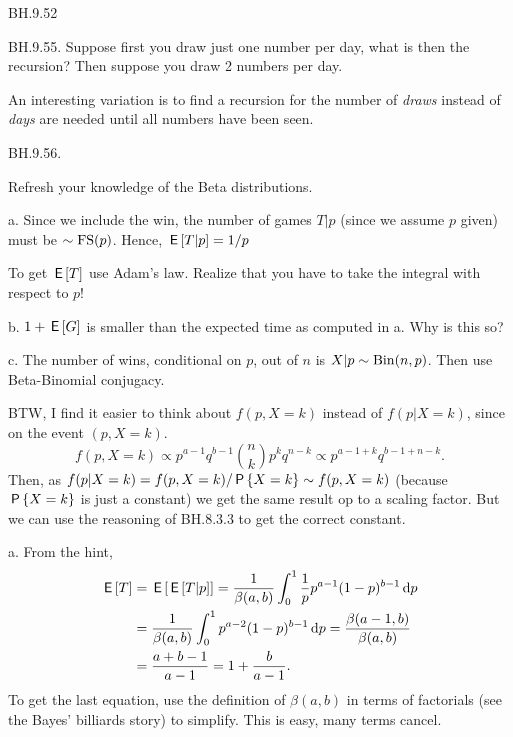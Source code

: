 \begin{exercise}
BH.9.52
\end{exercise}

\begin{exercise}
BH.9.55.  Suppose first you draw just one number per day, what is then the recursion? Then suppose you draw 2 numbers per day.

An interesting variation is to find a recursion for the number of \emph{draws} instead of \emph{days} are needed until all  numbers have been seen.
\end{exercise}

\begin{exercise}
BH.9.56.
\begin{hint}
Refresh your  knowledge of the Beta distributions.

a. Since we include the win, the number of games $T|p$ (since we assume $p$ given) must be $\sim\FS{p}$. Hence, $\E{T|p} = 1/p$

To get $\E T$ use Adam's law. Realize that you have to take the integral with respect to $p$!

b. $1+\E G$ is smaller than the expected time as computed in a. Why is this so?

c. The number of wins, conditional on $p$, out of $n$ is $X|p\sim\Bin{n,p}$. Then use Beta-Binomial conjugacy.

BTW, I find it easier to think about $f(p, X=k)$ instead of $f(p|X=k)$, since on the event $(p, X=k)$.
\begin{equation*}
f(p, X=k) \propto p^{a-1} q^{b-1} {n \choose k} p^k q^{n-k} \propto p^{a-1+k}q^{b-1+n-k}.
\end{equation*}
Then, as  $f(p|X=k) = f(p, X=k)/\P{X=k} \sim f(p, X=k)$ (because $\P{X=k}$ is just a constant) we get the same result op to a scaling factor. But we can use the reasoning of BH.8.3.3 to get the correct constant.
\end{hint}
\begin{solution}
a. From the hint,
\begin{align*}
\E{T}
&=\E{\E{T|p}} = \frac{1}{\beta(a,b)}\int_0^{1}\frac 1 p p^{a-1}(1-p)^{b-1} \d p \\
&= \frac{1}{\beta(a,b)}\int_0^{1} p^{a-2}(1-p)^{b-1} \d p
= \frac{\beta(a-1, b)}{\beta(a,b)} \\
&= \frac{a+b-1}{a-1} = 1 + \frac b {a-1}.
\end{align*}
To get the last equation,  use the definition of $\beta(a,b)$ in terms of factorials (see the Bayes' billiards story) to simplify. This is easy, many terms cancel.



\end{solution}
\end{exercise}
